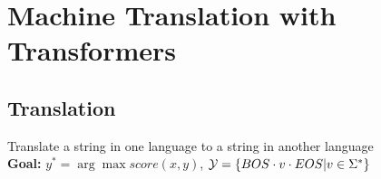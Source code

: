 \begin{comment}
	\pagebreak
\end{comment}

\section{Machine Translation with Transformers}
\begin{comment}
\subsection{Structure}

	\begin{itemize}
	
	\item Translation
	\begin{itemize}
	\item Task Definition
	\item Problem Decomposition
	\end{itemize}
	
	\item Sequence-to-Sequence Models
	\begin{itemize}
	\item Framework
	\item The Attention Mechanism
	\item Transformers
	\end{itemize}
	
	\item Decoding
	\begin{itemize}
	\item Decoding as Graph Search
	\item Common Strategies
	\end{itemize}	
	\end{itemize}
\end{comment}

\subsection{Translation}
Translate a string in one language to a string in another language\\

\textbf{Goal:} $y^* = \arg \max score(x,y)$, $\mathcal{Y} = \{ BOS \cdot v \cdot EOS | v \in \Sigma^* \}$\\
\begin{comment}
	We want to map strings in a source language to strings in a target language, where y is an element of $\cY$.
	Often we cap the size of the strings.\\
	The difference to transliteration is that the notion of correct is not as strong, since we here act in a space where ambiguity and flexibility of a language come into play.\\
\end{comment} 

